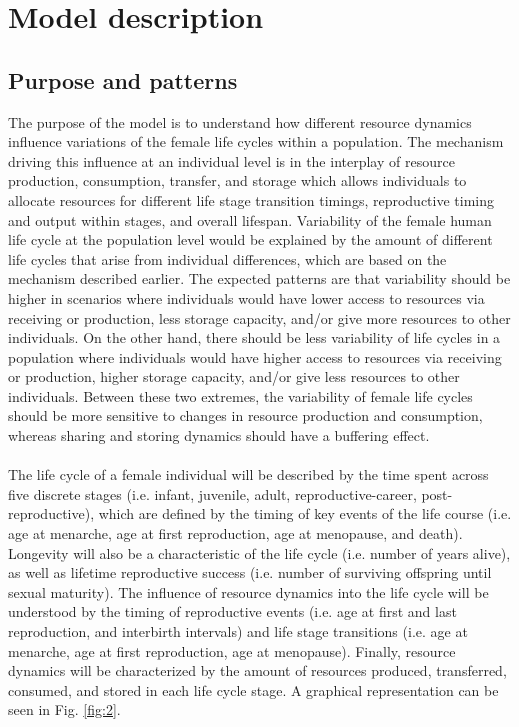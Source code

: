 \documentclass{article}
\begin{document}
\section{Model description}

\subsection{Purpose and patterns}

The purpose of the model is to understand how different resource dynamics influence variations of the female life cycles within a population. The mechanism driving this influence at an individual level is in the interplay of resource production, consumption, transfer, and storage which allows individuals to allocate resources for different life stage transition timings, reproductive timing and output within stages, and overall lifespan. Variability of the female human life cycle at the population level would be explained by the amount of different life cycles that arise from individual differences, which are based on the mechanism described earlier. The expected patterns are that variability should be higher in scenarios where individuals would have lower access to resources via receiving or production, less storage capacity, and/or give more resources to other individuals. On the other hand, there should be less variability of life cycles in a population where individuals would have higher access to resources via receiving or production, higher storage capacity, and/or give less resources to other individuals. Between these two extremes, the variability of female life cycles should be more sensitive to changes in resource production and consumption, whereas sharing and storing dynamics should have a buffering effect.
\\\\
The life cycle of a female individual will be described by the time spent across five discrete stages (i.e. infant, juvenile, adult, reproductive-career, post-reproductive), which are defined by the timing of key events of the life course (i.e. age at menarche, age at first reproduction, age at menopause, and death). Longevity will also be a characteristic of the life cycle (i.e. number of years alive), as well as lifetime reproductive success (i.e. number of surviving offspring until sexual maturity). The influence of resource dynamics into the life cycle will be understood by the timing of reproductive events (i.e. age at first and last reproduction, and interbirth intervals) and life stage transitions (i.e. age at menarche, age at first reproduction, age at menopause). Finally, resource dynamics will be characterized by the amount of resources produced, transferred, consumed, and stored in each life cycle stage. A graphical representation can be seen in Fig. \ref{fig:2}.
\end{document}
